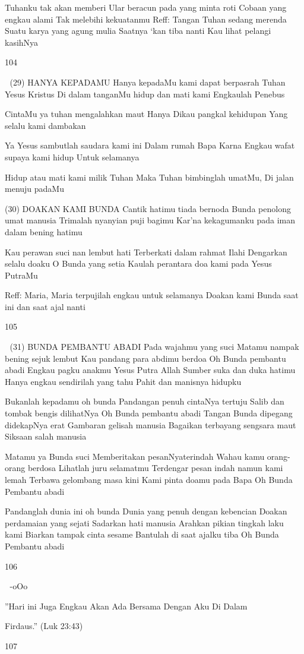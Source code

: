 \documentclass[10pt,a5paper,fancyhdr]{memoir}
\begin{document}
Tuhanku tak akan memberi 
Ular beracun pada yang minta roti 
Cobaan yang engkau alami 
Tak melebihi kekuatanmu 
Reff: 
Tangan Tuhan sedang merenda 
Suatu karya yang agung mulia 
Saatnya ‘kan tiba nanti 
Kau lihat pelangi kasihNya 

104 



(29) HANYA KEPADAMU 
Hanya kepadaMu kami dapat berpasrah 
Tuhan Yesus Kristus 
Di dalam tanganMu hidup dan mati kami 
Engkaulah Penebus 

CintaMu ya tuhan mengalahkan maut 
Hanya Dikau pangkal kehidupan 
Yang selalu kami dambakan 

Ya Yesus sambutlah saudara kami ini 
Dalam rumah Bapa 
Karna Engkau wafat supaya kami hidup 
Untuk selamanya 

Hidup atau mati kami milik Tuhan 
Maka Tuhan bimbinglah umatMu, Di jalan menuju padaMu 

(30) DOAKAN KAMI BUNDA 
Cantik hatimu tiada bernoda 
Bunda penolong umat manusia 
Trimalah nyanyian puji bagimu 
Kar’na kekagumanku pada iman dalam bening hatimu 

Kau perawan suci nan lembut hati 
Terberkati dalam rahmat Ilahi 
Dengarkan selalu doaku O Bunda yang setia 
Kaulah perantara doa kami pada Yesus PutraMu 

Reff: 
Maria, Maria terpujilah engkau untuk selamanya 
Doakan kami Bunda saat ini dan saat ajal nanti 

105 



(31) BUNDA PEMBANTU ABADI 
Pada wajahmu yang suci 
Matamu nampak bening sejuk lembut 
Kau pandang para abdimu berdoa 
Oh Bunda pembantu abadi 
Engkau pagku anakmu Yesus Putra Allah 
Sumber suka dan duka hatimu 
Hanya engkau sendirilah yang tahu 
Pahit dan manisnya hidupku 

Bukanlah kepadamu oh bunda 
Pandangan penuh cintaNya tertuju 
Salib dan tombak bengis dilihatNya 
Oh Bunda pembantu abadi 
Tangan Bunda dipegang didekapNya erat 
Gambaran gelisah manusia 
Bagaikan terbayang sengsara maut 
Siksaan salah manusia 

Matamu ya Bunda suci 
Memberitakan pesanNyaterindah 
Wahau kamu orang-orang berdosa 
Lihatlah juru selamatmu 
Terdengar pesan indah namun kami lemah 
Terbawa gelombang masa kini 
Kami pinta doamu pada Bapa 
Oh Bunda Pembantu abadi 

Pandanglah dunia ini oh bunda 
Dunia yang penuh dengan kebencian 
Doakan perdamaian yang sejati 
Sadarkan hati manusia 
Arahkan pikian tingkah laku kami 
Biarkan tampak cinta sesame 
Bantulah di saat ajalku tiba 
Oh Bunda Pembantu abadi 

106 



-oOo


”Hari ini Juga Engkau Akan Ada Bersama Dengan Aku Di Dalam 


Firdaus.” (Luk 23:43) 


107 
\end{document}
